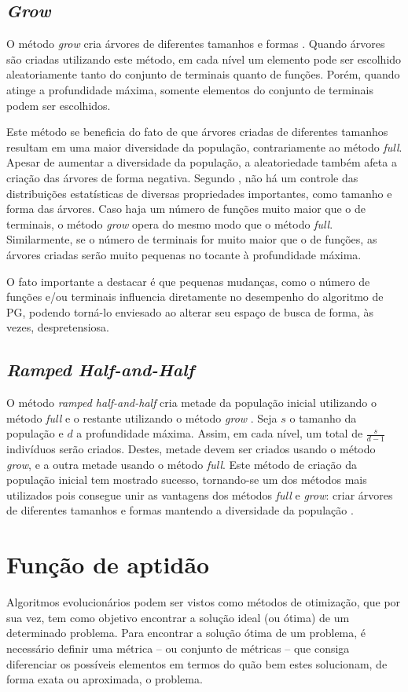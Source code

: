 \subsection{\textit{Grow}}
O método \textit{grow} cria árvores de diferentes tamanhos e formas \cite{koza1992}. Quando árvores são criadas utilizando este método, em cada nível um elemento pode ser escolhido aleatoriamente tanto do conjunto de terminais quanto de funções. Porém, quando atinge a profundidade máxima, somente elementos do conjunto de terminais podem ser escolhidos.

Este método se beneficia do fato de que árvores criadas de diferentes tamanhos resultam em uma maior diversidade da população, contrariamente ao método \textit{full}. Apesar de aumentar a diversidade da população, a aleatoriedade também afeta a criação das árvores de forma negativa. Segundo , não há um controle das distribuições estatísticas de diversas propriedades importantes, como tamanho e forma das árvores. Caso haja um número de funções muito maior que o de terminais, o método \textit{grow} opera do mesmo modo que o método \textit{full}. Similarmente, se o número de terminais for muito maior que o de funções, as árvores criadas serão muito pequenas no tocante à profundidade máxima.

O fato importante a destacar é que pequenas mudanças, como o número de funções e/ou terminais influencia diretamente no desempenho do algoritmo de PG, podendo torná-lo enviesado ao alterar seu espaço de busca de forma, às vezes, despretensiosa.

\subsection{\textit{Ramped Half-and-Half}}
O método \textit{ramped half-and-half} cria metade da população inicial utilizando o método \textit{full} e o restante utilizando o método \textit{grow} \cite{poli2008}. Seja $s$ o tamanho da população e $d$ a profundidade máxima. Assim, em cada nível, um total de $\frac{s}{d-1}$ indivíduos serão criados. Destes, metade devem ser criados usando o método \textit{grow}, e a outra metade usando o método \textit{full}. Este método de criação da população inicial tem mostrado sucesso, tornando-se um dos métodos mais utilizados pois consegue unir as vantagens dos métodos \textit{full} e \textit{grow}: criar árvores de diferentes tamanhos e formas mantendo a diversidade da população \cite{koza1992}.

\section{Função de aptidão} \label{sec:fitness-functions}
Algoritmos evolucionários podem ser vistos como métodos de otimização, que por sua vez, tem como objetivo encontrar a solução ideal (ou ótima) de um determinado problema. Para encontrar a solução ótima de um problema, é necessário definir uma métrica -- ou conjunto de métricas -- que consiga diferenciar os possíveis elementos em termos do quão bem estes solucionam, de forma exata ou aproximada, o problema.


